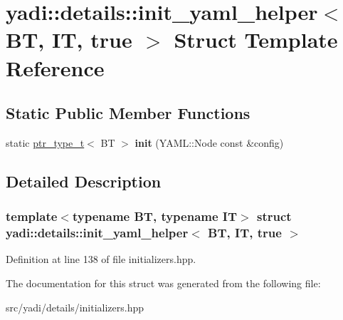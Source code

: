 \hypertarget{structyadi_1_1details_1_1init__yaml__helper_3_01_b_t_00_01_i_t_00_01true_01_4}{}\section{yadi\+:\+:details\+:\+:init\+\_\+yaml\+\_\+helper$<$ BT, IT, true $>$ Struct Template Reference}
\label{structyadi_1_1details_1_1init__yaml__helper_3_01_b_t_00_01_i_t_00_01true_01_4}
\subsection*{Static Public Member Functions}
\begin{DoxyCompactItemize}
\item 
\mbox{\label{structyadi_1_1details_1_1init__yaml__helper_3_01_b_t_00_01_i_t_00_01true_01_4_a7070e4a34e5dea1bd2388e45f67430c9}} 
static \hyperlink{namespaceyadi_a92290eb27cd90666aa87b17d854af9fe}{ptr\+\_\+type\+\_\+t}$<$ BT $>$ {\bfseries init} (Y\+A\+M\+L\+::\+Node const \&config)
\end{DoxyCompactItemize}


\subsection{Detailed Description}
\subsubsection*{template$<$typename BT, typename IT$>$\newline
struct yadi\+::details\+::init\+\_\+yaml\+\_\+helper$<$ B\+T, I\+T, true $>$}



Definition at line 138 of file initializers.\+hpp.



The documentation for this struct was generated from the following file\+:\begin{DoxyCompactItemize}
\item 
src/yadi/details/initializers.\+hpp\end{DoxyCompactItemize}
